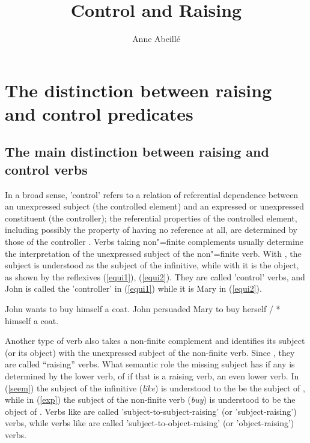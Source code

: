 \documentclass[output=paper
	        ,collection
	        ,collectionchapter
 	        ,biblatex
                ,babelshorthands
                ,newtxmath
                ,draftmode
                ,colorlinks, citecolor=brown
]{langscibook}
\author{%
	Anne Abeillé\affiliation{Université de Paris}%
}
\title{Control and Raising}
\begin{document}
\maketitle
\label{chap-control-raising}



\section{The distinction between raising and control predicates}

\subsection{The main distinction between raising and control verbs}

In a broad sense, 'control' refers to a relation of referential dependence between an unexpressed subject (the controlled element) and an expressed or unexpressed constituent (the controller); the referential properties of the controlled element, including possibly the property of having no reference at all, are determined by those of the controller \citep[372]{Bresnan1982}. Verbs taking non"=finite complements usually determine the interpretation of the unexpressed subject of the non"=finite verb. With , the subject is understood as the subject of the infinitive, while with  it is the object, as shown by the reflexives (\ref{equi1}), (\ref{equi2}). They are called 'control' verbs, and John is called the 'controller' in (\ref{equi1}) while it is Mary in (\ref{equi2}).

	\begin{exe}
	\ex \begin{xlist}
	\ex John wants to buy himself a coat. \label{equi1}
   \ex 	John persuaded Mary to buy herself / * himself a coat.\label{equi2}
 \end{xlist}
 \end{exe}


Another type of verb also takes a non-finite complement and identifies its subject (or its object) with the unexpressed subject of the non-finite verb. Since \citet{Postal1974}, they are called ``raising'' verbs. What semantic role the missing subject has if any is determined by the lower verb, of if that is a raising verb, an even lower verb. In (\ref{seem}) the subject of the infinitive (\emph{like}) is understood to the be the subject of , while in (\ref{exp}) the subject of the non-finite verb (\emph{buy}) is understood to be the object of . Verbs like  are called 'subject-to-subject-raising' (or 'subject-raising') verbs, while
verbs like  are called 'subject-to-object-raising' (or 'object-raising') verbs.
\end{document}
